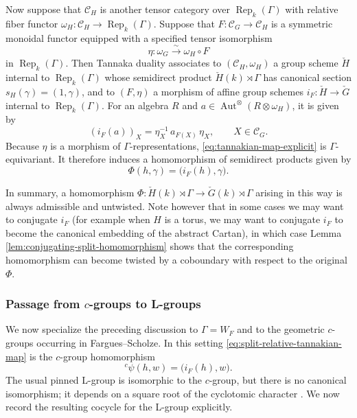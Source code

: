 \documentclass[reqno]{amsart}
\numberwithin{equation}{subsection}
\newcommand{\co}{\colon}
\newcommand{\lc}{{}^c}
\newcommand\cC{\mathcal{C}}
\DeclareMathOperator{\Aut}{Aut}
\DeclareMathOperator{\Rep}{Rep}
\newcommand{\chG}{\check{G}}
\newcommand{\chH}{\check{H}}
\theoremstyle{remark}
\numberwithin{equation}{subsection}
\numberwithin{figure}{subsection}
\begin{document}
Now suppose that $\cC_H$ is another tensor category over $\Rep_k(\Gamma)$ with relative fiber functor $\omega_H\co\mathcal C_H\longrightarrow\Rep_k(\Gamma)$.
Suppose that $F\co\mathcal C_G\longrightarrow\mathcal C_H$
is a symmetric monoidal functor equipped with a specified tensor
isomorphism
\begin{equation}\label{eq:relative-fiber-rigidification}
\eta\co\omega_G\xrightarrow{\sim}\omega_H\circ F
\end{equation}
in $\Rep_k(\Gamma)$. Then Tannaka duality associates to $(\cC_H, \omega_H)$ a group scheme $\chH$ internal to $\Rep_k(\Gamma)$ whose semidirect product $\chH(k)\rtimes\Gamma$ has canonical section $s_H(\gamma)=(1,\gamma)$, and to $(F,\eta)$ a
morphism of affine group schemes $i_F\co\check H\longrightarrow\check G$ internal to
$\Rep_k(\Gamma)$.
For an algebra $R$ and
$a\in\Aut^\otimes(R\otimes\omega_H)$, it is given by
\begin{equation}\label{eq:tannakian-map-explicit}
(i_F(a))_X
=\eta_X^{-1}\,a_{F(X)}\,\eta_X,
\qquad X\in\mathcal C_G.
\end{equation}
Because $\eta$ is a morphism of $\Gamma$-representations,
\eqref{eq:tannakian-map-explicit} is $\Gamma$-equivariant. It therefore induces a homomorphism of semidirect products given by
\begin{equation}\label{eq:split-relative-tannakian-map}
\Phi(h,\gamma)=\bigl(i_F(h),\gamma\bigr).
\end{equation}

In summary, a homomorphism $\Phi\co\chH(k)\rtimes\Gamma\to\chG(k)\rtimes\Gamma$ arising in this way is always admissible and untwisted. Note however that in some cases we may want to conjugate $i_F$ (for example when $H$ is a torus, we may want to conjugate $i_F$ to become the canonical embedding of the abstract Cartan), in which case Lemma
\ref{lem:conjugating-split-homomorphism} shows that the corresponding homomorphism can become twisted by a coboundary with respect to the original $\Phi$. 

\subsubsection{Passage from $c$-groups to L-groups}
\label{sssec:c-groups-to-L-groups}

We now specialize the preceding discussion to $\Gamma=W_F$ and to the
geometric $c$-groups occurring in Fargues--Scholze.  In this setting
\eqref{eq:split-relative-tannakian-map} is the
$c$-group homomorphism
\begin{equation}\label{eq:split-c-group-map}
\lc\psi(h,w)=\bigl(i_F(h),w\bigr).
\end{equation}
The usual pinned L-group is isomorphic to the $c$-group, but there is no canonical isomorphism; it depends on a square root of the cyclotomic character
\cite[Lemma 5.5.7]{Zhu17a}.  We now record the resulting cocycle for the L-group explicitly.
\end{document}
